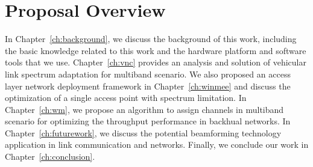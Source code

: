 \section{Proposal Overview}

In Chapter~\ref{ch:background}, we discuss the background of this work, including the basic
knowledge related to this work and the hardware platform and software tools that we 
use. 
Chapter~\ref{ch:vnc} provides an analysis and solution of vehicular link spectrum adaptation
for multiband scenario. We also proposed an access layer network deployment framework
in Chapter~\ref{ch:winmee} and discuss the optimization of a single access point with 
spectrum limitation.
In Chapter~\ref{ch:wm}, we propose an algorithm to assign channels in multiband scenario
for optimizing the throughput performance in backhual networks.
In Chapter~\ref{ch:futurework}, we discuss the potential beamforming technology application
in link communication and networks.
Finally, we conclude our work in Chapter~\ref{ch:conclusion}.


